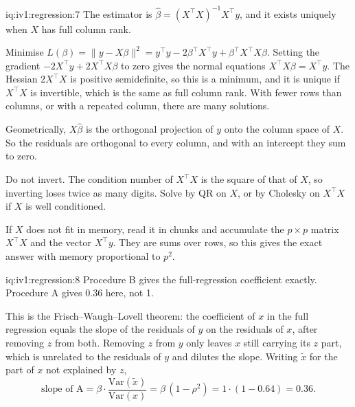 \begin{solution}{iq:iv1:regression:7}
The estimator is $\hat\beta = (X^\top X)^{-1}X^\top y$, and it exists uniquely when $X$ has full column rank.

Minimise $L(\beta) = \lVert y - X\beta\rVert^2 = y^\top y - 2\beta^\top X^\top y + \beta^\top X^\top X\beta$. Setting the gradient $-2X^\top y + 2X^\top X\beta$ to zero gives the normal equations $X^\top X\beta = X^\top y$. The Hessian $2X^\top X$ is positive semidefinite, so this is a minimum, and it is unique if $X^\top X$ is invertible, which is the same as full column rank. With fewer rows than columns, or with a repeated column, there are many solutions.

Geometrically, $X\hat\beta$ is the orthogonal projection of $y$ onto the column space of $X$. So the residuals are orthogonal to every column, and with an intercept they sum to zero.

Do not invert. The condition number of $X^\top X$ is the square of that of $X$, so inverting loses twice as many digits. Solve by QR on $X$, or by Cholesky on $X^\top X$ if $X$ is well conditioned.

If $X$ does not fit in memory, read it in chunks and accumulate the $p \times p$ matrix $X^\top X$ and the vector $X^\top y$. They are sums over rows, so this gives the exact answer with memory proportional to $p^2$.

\end{solution}

\begin{solution}{iq:iv1:regression:8}
Procedure B gives the full-regression coefficient exactly. Procedure A gives $0.36$ here, not 1.

This is the Frisch--Waugh--Lovell theorem: the coefficient of $x$ in the full regression equals the slope of the residuals of $y$ on the residuals of $x$, after removing $z$ from both. Removing $z$ from $y$ only leaves $x$ still carrying its $z$ part, which is unrelated to the residuals of $y$ and dilutes the slope. Writing $\tilde x$ for the part of $x$ not explained by $z$,
\[
\text{slope of A} = \beta \cdot \frac{\mathrm{Var}(\tilde x)}{\mathrm{Var}(x)} = \beta\,(1 - \rho^2) = 1 \cdot (1 - 0.64) = 0.36 .
\]
\end{solution}

